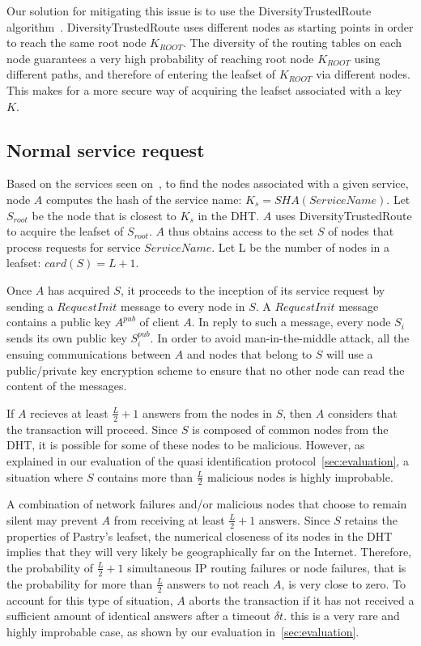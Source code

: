Our solution for mitigating this issue is to use the DiversityTrustedRoute
algorithm~\cite{diversity_trusted_route}. DiversityTrustedRoute uses different
nodes as starting points in order to reach the same root node $K_{ROOT}$. The
diversity of the routing tables on each node guarantees a very high probability
of reaching root node $K_{ROOT}$ using different paths, and therefore of
entering the leafset of $K_{ROOT}$ via different nodes. This makes for a more
secure way of acquiring the leafset associated with a key $K$.

\subsection{Normal service request}

Based on the services seen on~\cite{p2p_certification}, to find the nodes associated with a given
service, node $A$ computes the hash
of the service name: $K_s = SHA(ServiceName)$. Let $S_{root} $ be the node that
is closest to $K_s$ in the DHT. $A$ uses DiversityTrustedRoute to acquire the
leafset of $S_{root}$. $A$ thus obtains access to the set $S$ of nodes that
process requests for service $ServiceName$. Let L be the number of nodes in a
leafset: $card(S) = L + 1$.

Once $A$ has acquired $S$, it proceeds to the inception of its service request
by sending a $RequestInit$ message to every node in $S$. A $RequestInit$
message contains a public key $A^{pub}$ of client $A$. In reply to such a
message, every node $S_i$ sends its own public key $S^{pub}_i$. In order to
avoid man-in-the-middle attack, all the ensuing communications between $A$ and
nodes that belong to $S$ will use a public/private key encryption scheme to
ensure that no other node can read the content of the messages.

If $A$ recieves at least $\frac{L}{2} + 1$ answers from the nodes in $S$, then
$A$ considers that the transaction will proceed. Since $S$ is composed of
common nodes from the DHT, it is possible for some of these nodes to be
malicious. However, as explained in our evaluation of the quasi identification
protocol~\ref{sec:evaluation}, a situation where $S$ contains more than
$\frac{L}{2}$ malicious nodes is highly improbable.

A combination of network failures and/or malicious nodes that choose to remain
silent may prevent $A$ from receiving at least $\frac{L}{2} + 1$ answers. Since
$S$ retains the properties of Pastry's leafset, the numerical closeness of its
nodes in the DHT implies that they will very likely be geographically far on
the Internet. Therefore, the probability of $\frac{L}{2} + 1 $ simultaneous IP
routing failures or node failures, that is the probability for more than
$\frac{L}{2}$ answers to not reach $A$, is very close to zero. To account for
this type of situation, $A$ aborts the transaction if it has not received a
sufficient amount of identical answers after a timeout $\delta t$. this is a
very rare and highly improbable case, as shown by our evaluation
in~\ref{sec:evaluation}.

